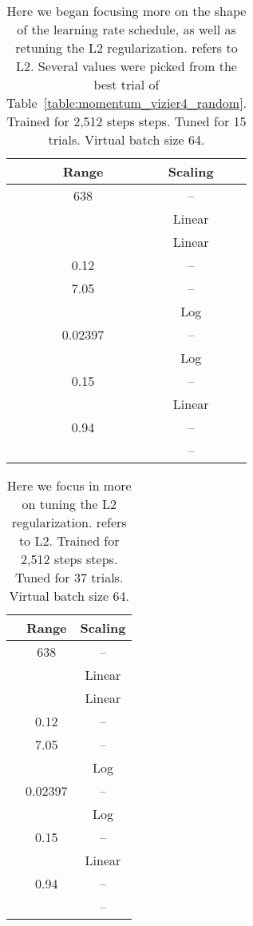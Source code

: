 \documentclass{article}
\begin{document}
\begin{table}[t]
\centering
\setlength{\extrarowheight}{3.5pt}
\begin{tabular}{|c|c|c|}
\hline
 & Range & Scaling \\ \hline
 & 638 & -- \\ \hline
 &  & Linear \\ \hline
 &  & Linear \\ \hline
 & 0.12 & -- \\ \hline
 & 7.05 & -- \\ \hline
 &  & Log \\ \hline
 &  0.02397 & -- \\ \hline
 &  & Log \\ \hline
 & 0.15 & -- \\ \hline
 &  & Linear \\ \hline
 & 0.94 & -- \\ \hline
 &  & -- \\ \hline
\end{tabular}
\caption{Here we began focusing more on the shape of the learning rate schedule, as well as retuning the L2 regularization.  refers to L2. Several values were picked from the best trial of Table~\ref{table:momentum_vizier4_random}. Trained for 2,512 steps steps. Tuned for 15 trials. Virtual batch size 64.}
\label{table:momentum_vizier5_random}
\end{table}



\begin{table}[t]
\centering
\setlength{\extrarowheight}{3.5pt}
\begin{tabular}{|c|c|c|}
\hline
 & Range & Scaling \\ \hline
 & 638 & -- \\ \hline
 &  & Linear \\ \hline
 &  & Linear \\ \hline
 & 0.12 & -- \\ \hline
 & 7.05 & -- \\ \hline
 &  & Log \\ \hline
 &  0.02397 & -- \\ \hline
 &  & Log \\ \hline
 & 0.15 & -- \\ \hline
 &  & Linear \\ \hline
 & 0.94 & -- \\ \hline
 &  & -- \\ \hline
\end{tabular}
\caption{Here we focus in more on tuning the L2 regularization.  refers to L2. Trained for 2,512 steps steps. Tuned for 37 trials. Virtual batch size 64.}
\end{table}
\end{document}
